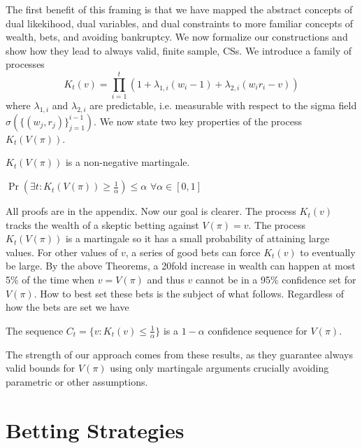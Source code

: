 The first benefit of this framing is that we have mapped the abstract concepts
of dual likekihood, dual variables, and dual constraints to more familiar
concepts of wealth, bets, and avoiding bankruptcy.  We now formalize our
constructions and show how they lead to always valid, finite sample, CSs. We
introduce a family of processes
\[
K_t(v) = \prod_{i=1}^t (1+\lambda_{1,i} (w_i-1) +\lambda_{2,i}(w_i r_i - v))
\]
where $\lambda_{1,i}$ and $\lambda_{2,i}$ are predictable, i.e. measurable with
respect to the sigma field $\sigma(\{(w_j,r_j)\}_{j=1}^{i-1})$.  We now state
two key properties of the process $K_t(V(\pi))$.
\begin{theorem}
\label{thm:martingale}
$K_t(V(\pi))$ is a non-negative martingale.
\end{theorem}
\begin{theorem}
\label{thm:ville}
$\Pr(\exists t: K_t(V(\pi)) \geq \frac{1}{\alpha})\leq \alpha$
$\forall \alpha \in [0,1]$
\end{theorem}
All proofs are in the appendix.  Now our goal is clearer. The process $K_t(v)$
tracks the wealth of a skeptic betting against $V(\pi)=v$. The process
$K_t(V(\pi))$ is a martingale so it has a small probability of attaining large
values. For other values of $v$, a series of good bets can force $K_t(v)$ to
eventually be large.  By the above Theorems, a 20fold increase in wealth can
happen at most 5\% of the time when $v=V(\pi)$ and thus $v$ cannot be in a 95\%
confidence set for $V(\pi)$. How to best set these bets is the subject of what
follows.  Regardless of how the bets are set we have
\begin{theorem}
\label{thm:cs}
The sequence $C_t = \{v:K_t(v)\leq \frac{1}{\alpha}\}$ is a $1-\alpha$ confidence sequence for $V(\pi)$.
\end{theorem}
The strength of our approach comes from these results, as they guarantee always
valid bounds for $V(\pi)$ using only martingale arguments crucially avoiding
parametric or other assumptions.

\section{Betting Strategies}

